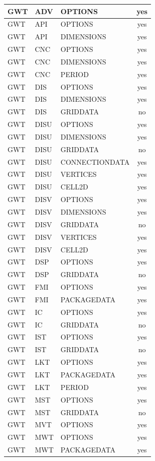 \begin{longtable}{p{1.5cm} p{1.5cm} p{3cm} c}
\hline
GWT & ADV & OPTIONS & yes \\ 
\hline
GWT & API & OPTIONS & yes \\ 
GWT & API & DIMENSIONS & yes \\ 
\hline
GWT & CNC & OPTIONS & yes \\ 
GWT & CNC & DIMENSIONS & yes \\ 
GWT & CNC & PERIOD & yes \\ 
\hline
GWT & DIS & OPTIONS & yes \\ 
GWT & DIS & DIMENSIONS & yes \\ 
GWT & DIS & GRIDDATA & no \\ 
\hline
GWT & DISU & OPTIONS & yes \\ 
GWT & DISU & DIMENSIONS & yes \\ 
GWT & DISU & GRIDDATA & no \\ 
GWT & DISU & CONNECTIONDATA & yes \\ 
GWT & DISU & VERTICES & yes \\ 
GWT & DISU & CELL2D & yes \\ 
\hline
GWT & DISV & OPTIONS & yes \\ 
GWT & DISV & DIMENSIONS & yes \\ 
GWT & DISV & GRIDDATA & no \\ 
GWT & DISV & VERTICES & yes \\ 
GWT & DISV & CELL2D & yes \\ 
\hline
GWT & DSP & OPTIONS & yes \\ 
GWT & DSP & GRIDDATA & no \\ 
\hline
GWT & FMI & OPTIONS & yes \\ 
GWT & FMI & PACKAGEDATA & yes \\ 
\hline
GWT & IC & OPTIONS & yes \\ 
GWT & IC & GRIDDATA & no \\ 
\hline
GWT & IST & OPTIONS & yes \\ 
GWT & IST & GRIDDATA & no \\ 
\hline
GWT & LKT & OPTIONS & yes \\ 
GWT & LKT & PACKAGEDATA & yes \\ 
GWT & LKT & PERIOD & yes \\ 
\hline
GWT & MST & OPTIONS & yes \\ 
GWT & MST & GRIDDATA & no \\ 
\hline
GWT & MVT & OPTIONS & yes \\ 
\hline
GWT & MWT & OPTIONS & yes \\ 
GWT & MWT & PACKAGEDATA & yes \\ 

\end{longtable}
